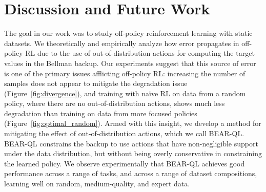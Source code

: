 \section{Discussion and Future Work}
\vspace{-5pt}
The goal in our work was to study off-policy reinforcement learning with static datasets. We theoretically and empirically analyze how error propagates in off-policy RL due to the use of out-of-distribution actions for computing the target values in the Bellman backup. Our experiments suggest that this source of error is one of the primary issues afflicting off-policy RL: increasing the number of samples does not appear to mitigate the degradation issue (Figure~\ref{fig:divergence}), and training with na\"{i}ve RL on data from a random policy, where there are no out-of-distribution actions, shows much less degradation than training on data from more focused policies (Figure~\ref{fig:optimal_random}). Armed with this insight, we develop a method for mitigating the effect of out-of-distribution actions, which we call BEAR-QL. BEAR-QL constrains the backup to use actions that have non-negligible support under the data distribution, but without being overly conservative in constraining the learned policy. We observe experimentally that BEAR-QL achieves good performance across a range of tasks, and across a range of dataset compositions, learning well on random, medium-quality, and expert data.

